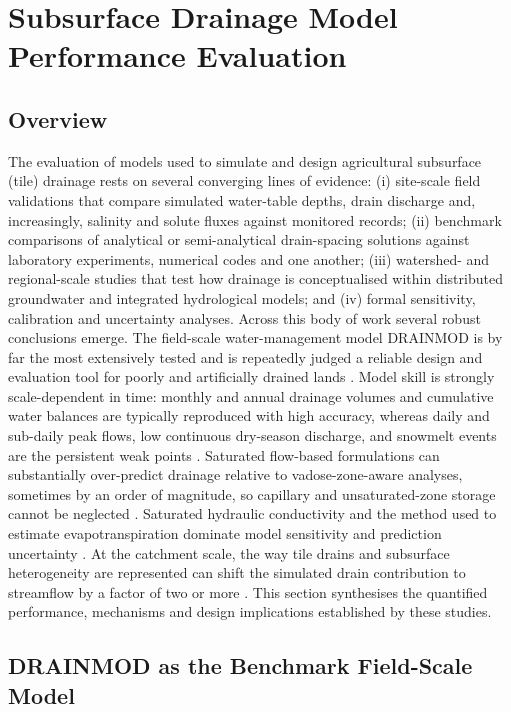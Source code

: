 \documentclass[11pt]{article}
\begin{document}
\section*{Subsurface Drainage Model Performance Evaluation}

\subsection{Overview}

The evaluation of models used to simulate and design agricultural subsurface (tile) drainage rests on several converging lines of evidence: (i) site-scale field validations that compare simulated water-table depths, drain discharge and, increasingly, salinity and solute fluxes against monitored records; (ii) benchmark comparisons of analytical or semi-analytical drain-spacing solutions against laboratory experiments, numerical codes and one another; (iii) watershed- and regional-scale studies that test how drainage is conceptualised within distributed groundwater and integrated hydrological models; and (iv) formal sensitivity, calibration and uncertainty analyses. Across this body of work several robust conclusions emerge. The field-scale water-management model \textsc{DRAINMOD} is by far the most extensively tested and is repeatedly judged a reliable design and evaluation tool for poorly and artificially drained lands \parencite{Singh2019b,Gowda2012}. Model skill is strongly scale-dependent in time: monthly and annual drainage volumes and cumulative water balances are typically reproduced with high accuracy, whereas daily and sub-daily peak flows, low continuous dry-season discharge, and snowmelt events are the persistent weak points \parencite{Gowda2012,Dayyani2009,Morrison2014,Varvaris2018}. Saturated flow-based formulations can substantially over-predict drainage relative to vadose-zone-aware analyses, sometimes by an order of magnitude, so capillary and unsaturated-zone storage cannot be neglected \parencite{Xin2016b}. Saturated hydraulic conductivity and the method used to estimate evapotranspiration dominate model sensitivity and prediction uncertainty \parencite{NabiSichani2012,Malakshahi2020,Wang2006}. At the catchment scale, the way tile drains and subsurface heterogeneity are represented can shift the simulated drain contribution to streamflow by a factor of two or more \parencite{Karan2021,Boico2022}. This section synthesises the quantified performance, mechanisms and design implications established by these studies.

\subsection{DRAINMOD as the Benchmark Field-Scale Model}
\end{document}
